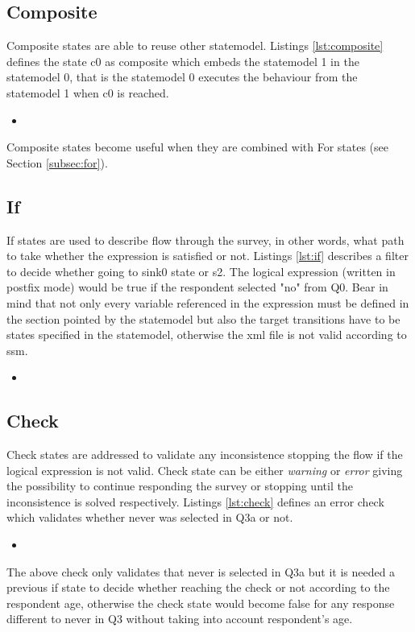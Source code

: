 \documentclass{article}
\newcommand{\insertcode}[3]{\begin{itemize}\item[]\end{itemize}} %
\begin{document}
	\subsection{Composite}
	Composite states are able to reuse other statemodel. Listings \ref{lst:composite} defines the state c0 as composite which embeds the statemodel 1 in the statemodel 0, that is the statemodel 0 executes the behaviour from the statemodel 1 when c0 is reached.
\insertcode{"scripts/composite.xml"}{Composite state example}{lst:composite}
Composite states become useful when they are combined with For states (see Section \ref{subsec:for}).
	\subsection{If}
	If states are used to describe flow through the survey, in other words, what path to take whether the expression is satisfied or not. Listings \ref{lst:if} describes a filter to decide whether going to sink0 state or s2. The logical expression (written in postfix mode) would be true if the respondent selected "no" from Q0. Bear in mind that not only every variable referenced in the expression must be defined in the section pointed by the statemodel but also the target transitions have to be states specified in the statemodel, otherwise the \gls{xml} file is not valid according to \gls{ssm}.
\insertcode{"scripts/if.xml"}{If state example}{lst:if}
	\subsection{Check}
	Check states are addressed to validate any inconsistence stopping the flow if the logical expression is not valid. Check state can be either \emph{warning} or \emph{error} giving the possibility to continue responding the survey or stopping until the inconsistence is solved respectively. Listings \ref{lst:check} defines an error check which validates whether never was selected in Q3a or not.
\insertcode{"scripts/check.xml"}{Check state example}{lst:check}
The above check only validates that never is selected in Q3a but it is needed a previous if state to decide whether reaching the check or not according to the respondent age, otherwise the check state would become false for any response different to never in Q3 without taking into account respondent's age.
\end{document}
